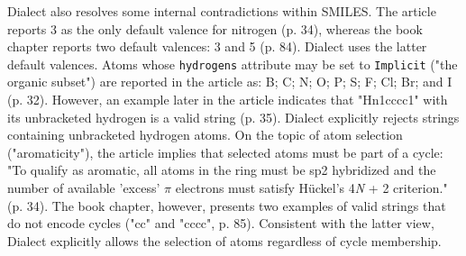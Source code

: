 \documentclass{article}
\def\ttt{\texttt}
\begin{document}
Dialect also resolves some internal contradictions within SMILES. The article reports 3 as the only default valence for nitrogen (p. 34), whereas the book chapter reports two default valences: 3 and 5 (p. 84). Dialect uses the latter default valences. Atoms whose \ttt{hydrogens} attribute may be set to \ttt{Implicit} ("the organic subset") are reported in the article as: B; C; N; O; P; S; F; Cl; Br; and I (p. 32). However, an example later in the article indicates that "Hn1cccc1" with its unbracketed hydrogen is a valid string (p. 35). Dialect explicitly rejects strings containing unbracketed hydrogen atoms. On the topic of atom selection ("aromaticity"), the article implies that selected atoms must be part of a cycle: "To qualify as aromatic, all atoms in the ring must be sp2 hybridized and the number of available 'excess' $\pi$ electrons must satisfy Hückel's 4{\textit{N}} + 2 criterion." (p. 34). The book chapter, however, presents two examples of valid strings that do not encode cycles ("cc" and "cccc", p. 85). Consistent with the latter view, Dialect explicitly allows the selection of atoms regardless of cycle membership.
\end{document}
